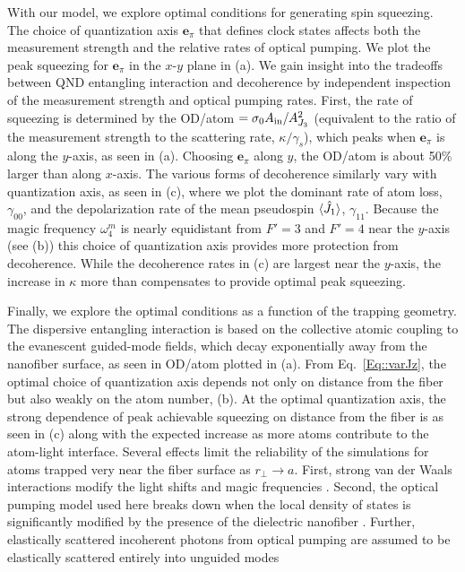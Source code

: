 \documentclass[aps,pra,twocolumn]{revtex4-1} %
\newcommand{\jx}{\hat{J}_1}
\newcommand{\qaxis}{\mathbf{e}_\pi}
\newcommand{\magic}[1]{\omega_{#1}^m}
\begin{document}
With our model, we explore optimal conditions for generating spin squeezing.  
The choice of quantization axis $\qaxis$ that defines clock states affects both the measurement strength and the relative rates of optical pumping. 
We plot the peak squeezing for $\qaxis$ in the $x$-$y$ plane in (a). 
We gain insight into the tradeoffs between QND entangling interaction and decoherence by independent inspection of the measurement strength and optical pumping rates.  
First, the rate of squeezing is determined by the OD/atom $=\sigma_0 A_{\rm in}/A_{J_3}^2$ (equivalent to the ratio of the measurement strength to the scattering rate, $\kappa/\gamma_s$), which peaks when $\qaxis$ is along the $y$-axis, as seen in (a). 
Choosing $\qaxis$ along $y$, the OD/atom is about 50\% larger than along $x$-axis.  
The various forms of decoherence similarly vary with quantization axis, as seen in (c), where we plot the dominant rate of atom loss, $\gamma_{00}$, and the depolarization rate of the mean pseudospin $\expt{\jx}$, $\gamma_{11}$. 
Because the magic frequency $\magic{4}$ is nearly equidistant from $F'=3$ and $F'=4$ near the $y$-axis (see (b)) this choice of quantization axis provides more protection from decoherence.   
While the decoherence rates in (c) are largest near the $y$-axis, the increase in $\kappa$ more than compensates to provide optimal peak squeezing.

Finally, we explore the optimal conditions as a function of the trapping geometry.  
The dispersive entangling interaction is based on the collective atomic coupling to the evanescent guided-mode fields, which decay exponentially away from the nanofiber surface, as seen in OD/atom plotted in (a). 
From Eq.~\eqref{Eq::varJz}, the optimal choice of quantization axis depends not only on distance from the fiber but also weakly on the atom number, (b).  
At the optimal quantization axis, the strong dependence of peak achievable squeezing on distance from the fiber is as seen in (c) along with the expected increase as more atoms contribute to the atom-light interface.  
Several effects limit the reliability of the simulations for atoms trapped very near the fiber surface as $r_\perp \rightarrow a$. 
First, strong van der Waals interactions modify the light shifts and magic frequencies \cite{vetsch_eugen_optical_2010, lacroute_state-insensitive_2012}.  
Second, the optical pumping model used here breaks down when the local density of states is significantly modified by the presence of the dielectric nanofiber \cite{le_kien_spontaneous_2005, le_kien_scattering_2006}. 
Further, elastically scattered incoherent photons from optical pumping are assumed to be elastically scattered entirely into unguided modes
\end{document}
